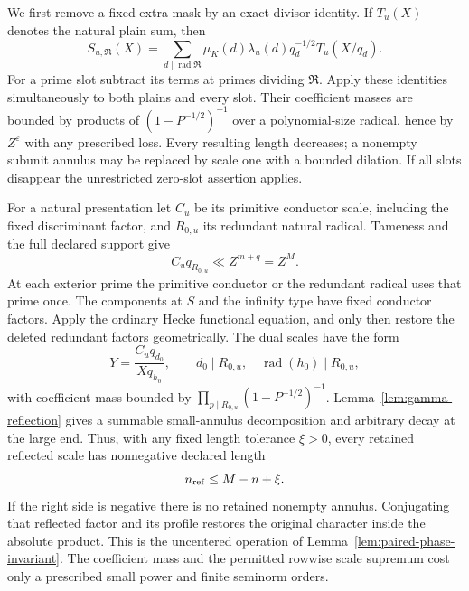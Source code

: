 \documentclass[11pt,a4paper]{article}
\numberwithin{equation}{section}
\theoremstyle{definition}
\theoremstyle{remark}
\newcommand{\eps}{\varepsilon}
\newcommand{\rad}{\operatorname{rad}}
\begin{document}
We first remove a fixed extra mask by an exact divisor identity.  If $T_u(X)$ denotes
the natural plain sum, then
\begin{equation}\label{eq:can-mask-delete}
 S_{u,\mathfrak R}(X)
   =\sum_{d\mid\rad\mathfrak R}
       \mu_K(d)\lambda_u(d)q_d^{-1/2}T_u(X/q_d).
\end{equation}
For a prime slot subtract its terms at primes dividing
$\mathfrak R$.  Apply these identities simultaneously to both
plains and every slot.  Their coefficient masses are bounded by
products of $(1-P^{-1/2})^{-1}$ over a polynomial-size radical,
hence by $Z^\eps$ with any prescribed loss.  Every resulting
length decreases; a nonempty subunit annulus may be replaced by
scale one with a bounded dilation.  If all slots disappear the
unrestricted zero-slot assertion applies.

For a natural presentation let $C_u$ be its primitive conductor
scale, including the fixed discriminant factor, and $R_{0,u}$ its
redundant natural radical.  Tameness and the full declared support
give
\begin{equation}\label{eq:can-conductor-natural}
 C_uq_{R_{0,u}}\ll Z^{m+q}=Z^M.
\end{equation}
At each exterior prime the primitive conductor or the redundant
radical uses that prime once.  The components at $S$
and the infinity type have fixed conductor factors.
Apply the ordinary Hecke functional equation, and only then restore
the deleted redundant factors geometrically.  The dual scales have
the form
\[
 Y=\frac{C_uq_{d_0}}{Xq_{h_0}},
 \qquad d_0\mid R_{0,u},\quad \rad(h_0)\mid R_{0,u},
\]
with coefficient mass bounded by
$\prod_{p\mid R_{0,u}}(1-P^{-1/2})^{-1}$.
Lemma~\ref{lem:gamma-reflection} gives a summable small-annulus
decomposition and arbitrary decay at the large end.
Thus, with any fixed length tolerance $\xi>0$, every retained
reflected scale has nonnegative declared length
\begin{equation}\label{eq:can-reflected-length}
 n_{\rm ref}\le M-n+\xi.
\end{equation}
If the right side is negative there is no retained nonempty annulus.
Conjugating that reflected factor and its profile restores the
original character inside the absolute product.  This is the uncentered operation of Lemma~\ref{lem:paired-phase-invariant}.
The coefficient mass and the permitted rowwise scale supremum cost
only a prescribed small power and finite seminorm orders.
\end{document}
